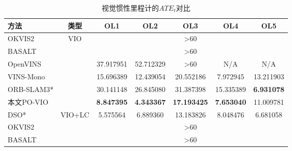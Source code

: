 \begin{table}
\centering
\begin{threeparttable}
\caption{视觉惯性里程计的$ATE_t$\textdownarrow{}对比}
\begin{tabular}{lcccccc}
\toprule
方法 & 类型           & OL1 & OL2 & OL3 & OL4 & OL5 \\ \midrule
OKVIS2          & \multirow{6}{*}{VIO}    & \multicolumn{5}{c}{\textgreater{}60}                       \\
BASALT          &                         & \multicolumn{5}{c}{\textgreater{}60}                       \\
OpenVINS        &                         & 37.917951                                & 52.712329                                & {\textgreater{}60}                               & N/A                                      & N/A                                      \\
VINS-Mono       &                         & 15.696389                                & 12.439054                                &20.552186                                & 7.972945                                 & 13.211903                                \\
ORB-SLAM3*       &                         & 30.141148                                & 26.845080                                & 31.387398                                & 15.335389                                & \cellcolor[HTML]{FFCCC9}\textbf{6.931078}                                 \\
本文PO-VIO            &                         & \cellcolor[HTML]{FFCCC9}\textbf{8.847395}                                 & \cellcolor[HTML]{FFCCC9}\textbf{4.343367}                                 &  \cellcolor[HTML]{FFCCC9}\textbf{17.193425}                                & \cellcolor[HTML]{FFCCC9}\textbf{7.653040}                                 & 11.009781                                \\ \midrule
DSO*         & \multirow{7}{*}{VIO+LC} & 5.575564                                 & 6.889360                                 & 13.183826                                & 8.048476                                 & 6.681058                                 \\
OKVIS2          &                         & \multicolumn{5}{c}{\textgreater{}60}                         \\
BASALT          &                         & \multicolumn{5}{c}{\textgreater{}60}                         \\

\end{tabular}
\end{threeparttable}
\end{table}
